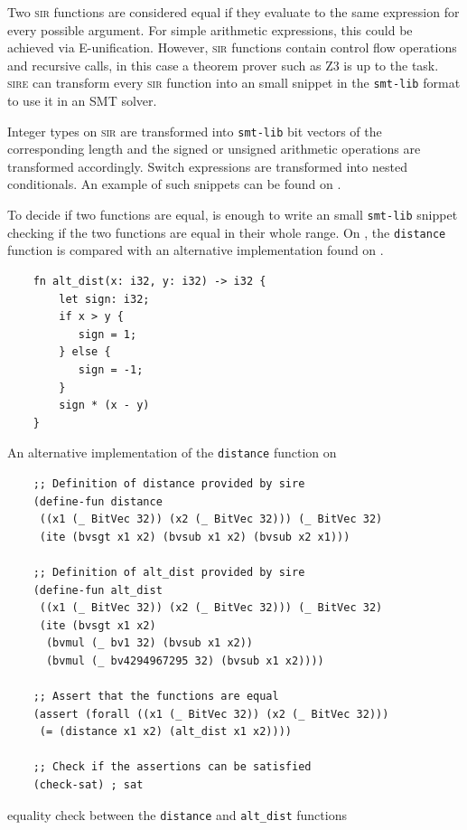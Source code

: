 Two \textsc{sir} functions are considered equal if they evaluate to the same
expression for every possible argument. For simple arithmetic expressions, this
could be achieved via E-unification. However, \textsc{sir} functions contain
control flow operations and recursive calls, in this case a theorem prover such
as Z3 is up to the task. \textsc{sire} can transform every \textsc{sir}
function into an small snippet in the \texttt{smt-lib} format to use it in an
SMT solver.

Integer types on \textsc{sir} are transformed into \texttt{smt-lib} bit vectors
of the corresponding length and the signed or unsigned arithmetic operations
are transformed accordingly.  Switch expressions are transformed into nested
conditionals. An example of such snippets can be found on
. 

To decide if two functions are equal, is enough to write an small
\texttt{smt-lib} snippet checking if the two functions are equal in their whole
range. On , the \texttt{distance} function is compared
with an alternative implementation found on . 

\begin{listing}[ht]
    \begin{verbatim}
    fn alt_dist(x: i32, y: i32) -> i32 {
        let sign: i32; 
        if x > y {
           sign = 1;
        } else {
           sign = -1;
        }
        sign * (x - y)
    }
    \end{verbatim}
    \caption{An alternative implementation of the \texttt{distance} function on }
  \label{lst:alt_distance}
\end{listing}

\begin{listing}[ht]
    \begin{verbatim}
    ;; Definition of distance provided by sire
    (define-fun distance 
     ((x1 (_ BitVec 32)) (x2 (_ BitVec 32))) (_ BitVec 32) 
     (ite (bvsgt x1 x2) (bvsub x1 x2) (bvsub x2 x1)))

    ;; Definition of alt_dist provided by sire
    (define-fun alt_dist 
     ((x1 (_ BitVec 32)) (x2 (_ BitVec 32))) (_ BitVec 32) 
     (ite (bvsgt x1 x2) 
      (bvmul (_ bv1 32) (bvsub x1 x2)) 
      (bvmul (_ bv4294967295 32) (bvsub x1 x2))))
    
    ;; Assert that the functions are equal
    (assert (forall ((x1 (_ BitVec 32)) (x2 (_ BitVec 32))) 
     (= (distance x1 x2) (alt_dist x1 x2)))) 

    ;; Check if the assertions can be satisfied
    (check-sat) ; sat
    \end{verbatim}
    \caption{equality check between the \texttt{distance} and \texttt{alt\_dist} functions}
  \label{lst:func_equality}
\end{listing}


